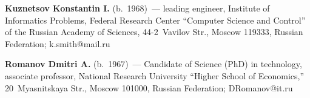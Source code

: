        \vspace*{6pt}
      
     \noindent
       \textbf{Kuznetsov Konstantin I.} (b.\ 1968)~--- leading engineer, Institute 
of Informatics Problems, Federal Research Center ``Computer Science and 
Control'' of the Russian Academy of Sciences,  44-2~Vavilov Str., Moscow 
119333, Russian Federation; \mbox{k.smith@mail.ru} 
       
       \vspace*{6pt}
       
     \noindent
       \textbf{Romanov Dmitri A.} (b.\ 1967)~--- Candidate of Science (PhD) in 
technology, associate professor, National Research University ``Higher School of 
Economics,'' 20~Myasnitskaya Str., Moscow 101000, Russian Federation; 
\mbox{DRomanov@it.ru} 

\label{end\stat}

\renewcommand{\bibname}{\protect\rm Литература}       
       